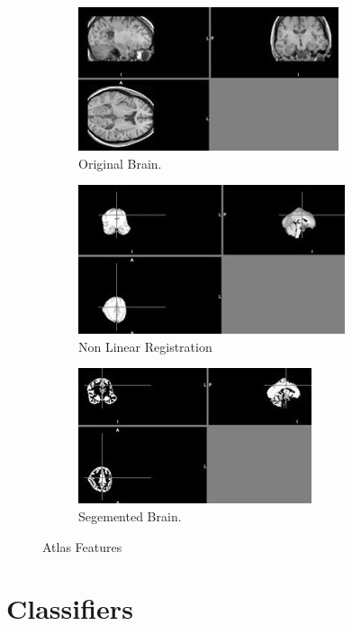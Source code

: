 \documentclass{article} %
\begin{document}
\begin{figure}[h]
\centering
\begin{subfigure}[b]{.3\linewidth}
\centering
\includegraphics[scale=0.25]{atlas1.jpg}
\caption{ Original Brain.}
\end{subfigure}
\begin{subfigure}[b]{.3\linewidth}
\centering
\includegraphics[scale=0.25]{Atlas2.jpg}
\caption{Non Linear Registration}
\end{subfigure}
\begin{subfigure}[b]{.3\linewidth}
\centering
\includegraphics[scale=0.25]{atlas3.jpg}
\caption{ Segemented Brain.}
\end{subfigure}
\caption{Atlas Features}
\end{figure}


\section{Classifiers}
\end{document}

